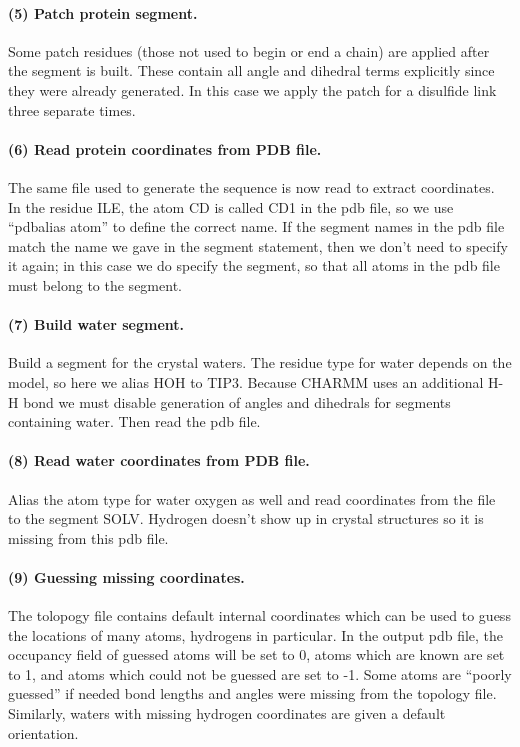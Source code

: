 \paragraph*{(5) Patch protein segment.}
Some patch residues (those not used to begin or end a chain) are
applied after the segment is built.  These contain all angle and
dihedral terms explicitly since they were already generated.  In this
case we apply the patch for a disulfide link three separate times.

\paragraph*{(6) Read protein coordinates from PDB file.}
The same file used to generate the sequence is now read to extract
coordinates.  In the residue ILE, the atom CD is called CD1 in the
pdb file, so we use ``pdbalias atom'' to define the correct name.  If the
segment names in the pdb file match the name we gave in the segment
statement, then we don't need to specify it again; in this case we
do specify the segment, so that all atoms in the pdb file must belong
to the segment.

\paragraph*{(7) Build water segment.}
Build a segment for the crystal waters.  The residue type for water
depends on the model, so here we alias HOH to TIP3.  Because CHARMM
uses an additional H-H bond we must disable generation of angles and
dihedrals for segments containing water.  Then read the pdb file.

\paragraph*{(8) Read water coordinates from PDB file.}
Alias the atom type for water oxygen as well and read coordinates from
the file to the segment SOLV.  Hydrogen doesn't show up in crystal
structures so it is missing from this pdb file.

\paragraph*{(9) Guessing missing coordinates.}
The tolopogy file contains default internal coordinates which can be
used to guess the locations of many atoms, hydrogens in particular.
In the output pdb file, the occupancy field of guessed atoms will be
set to 0, atoms which are known are set to 1, and atoms which could
not be guessed are set to -1.  Some atoms are ``poorly guessed'' if
needed bond lengths and angles were missing from the topology file.
Similarly, waters with missing hydrogen coordinates are given a
default orientation.

